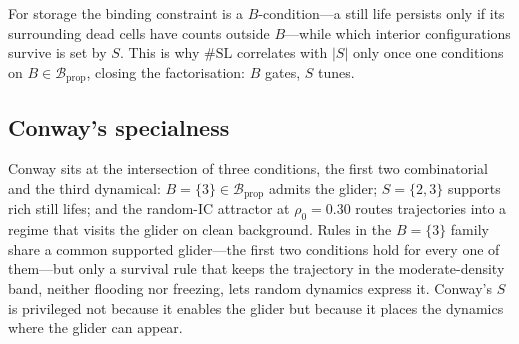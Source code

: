 \documentclass{article}
\begin{document}
For storage the binding constraint is a $B$-condition---a still life persists only
if its surrounding dead cells have counts outside $B$---while which interior
configurations survive is set by $S$. This is why $\#\mathrm{SL}$ correlates with
$|S|$ only once one conditions on $B\in\mathcal{B}_{\text{prop}}$, closing the
factorisation: $B$ gates, $S$ tunes.

\subsection{Conway's specialness}
\label{sec:disc-conway}
Conway sits at the intersection of three conditions, the first two combinatorial
and the third dynamical: $B=\{3\}\in\mathcal{B}_{\text{prop}}$ admits the glider;
$S=\{2,3\}$ supports rich still lifes; and the random-IC attractor at
$\rho_0=0.30$ routes trajectories into a regime that visits the glider on clean
background. Rules in the $B=\{3\}$ family share a common supported glider---the
first two conditions hold for every one of them---but only a survival rule that
keeps the trajectory in the moderate-density band, neither flooding nor freezing,
lets random dynamics express it. Conway's $S$ is privileged not because it enables
the glider but because it places the dynamics where the glider can appear.
\end{document}
